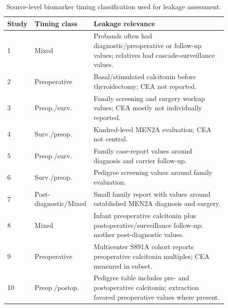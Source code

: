 \documentclass[12pt]{article}
\begin{document}
\begin{table}[ht]
\centering
\caption{Source-level biomarker timing classification used for leakage assessment.}
\small
\begin{tabular}{@{}p{0.12\linewidth}p{0.18\linewidth}p{0.60\linewidth}@{}}
\toprule
Study & Timing class & Leakage relevance \\
\midrule
1 & Mixed & Probands often had diagnostic/preoperative or follow-up values; relatives had cascade-surveillance values. \\
2 & Preoperative & Basal/stimulated calcitonin before thyroidectomy; CEA not reported. \\
3 & Preop./surv. & Family screening and surgery workup values; CEA mostly not individually reported. \\
4 & Surv./preop. & Kindred-level MEN2A evaluation; CEA not central. \\
5 & Preop./surv. & Family case-report values around diagnosis and carrier follow-up. \\
6 & Surv./preop. & Pedigree screening values around family evaluation. \\
7 & Post-diagnostic/Mixed & Small family report with values around established MEN2A diagnosis and surgery. \\
8 & Mixed & Infant preoperative calcitonin plus postoperative/surveillance follow-up; mother post-diagnostic values. \\
9 & Preoperative & Multicenter S891A cohort reports preoperative calcitonin multiples; CEA measured in subset. \\
10 & Preop./postop. & Pedigree table includes pre- and postoperative calcitonin; extraction favored preoperative values where present. \\
\bottomrule
\end{tabular}
\end{table}
\end{document}
